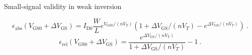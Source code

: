 \documentclass[aspectratio=169, t, 9pt]{beamer} %
\begin{document}
\begin{frame}{Small-signal validity in weak inversion}
\begin{figure}[htpb]
  \end{figure}

  \vspace{-0.5cm}
    \begin{equation}
        \epsilon_\text{abs} (V_\text{GS0} + \Delta V_\text{GS}) = I_\text{D0} \frac{W}{L} e^{V_\text{GS0}/(n V_T)} \left( 1 + \Delta V_\text{GS}/ (n V_T) - e^{\Delta V_\text{GS}/(n V_T)} \right) \ . 
    \end{equation}
    \begin{equation}
        \epsilon_\text{rel} (V_\text{GS0} + \Delta V_\text{GS}) = \frac{e^{\Delta V_\text{GS}/(n V_T)}}{1 + \Delta V_\text{GS}/(n V_T)} - 1 \ . 
    \end{equation}
\end{frame}
\end{document}
